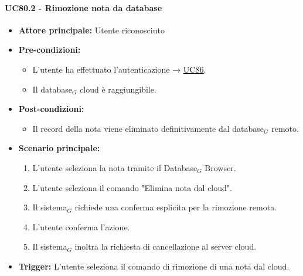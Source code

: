 \documentclass[a4paper, 10pt]{article}
\newcommand{\uclink}[2]{\hyperlink{#1}{\textcolor{black}{\underline{#2}}}}
\begin{document}
\paragraph{UC80.2 - Rimozione nota da database}
\hypertarget{uc:80.2}{}
\begin{itemize}
    \item \textbf{Attore principale:} Utente riconosciuto
    \item \textbf{Pre-condizioni:} 
        \begin{itemize}
            \item L'utente ha effettuato l'autenticazione → \uclink{uc:86}{UC86}.
            \item Il database$_G$ cloud è raggiungibile.
        \end{itemize}
    \item \textbf{Post-condizioni:} 
        \begin{itemize}
            \item Il record della nota viene eliminato definitivamente dal database$_G$ remoto.
        \end{itemize}
    \item \textbf{Scenario principale:}
        \begin{enumerate}
            \item L'utente seleziona la nota tramite il Database$_G$ Browser.
            \item L'utente seleziona il comando "Elimina nota dal cloud".
            \item Il sistema$_G$ richiede una conferma esplicita per la rimozione remota.
            \item L'utente conferma l'azione.
            \item Il sistema$_G$ inoltra la richiesta di cancellazione al server cloud.
        \end{enumerate}
    \item \textbf{Trigger:} L'utente seleziona il comando di rimozione di una nota dal cloud.
\end{itemize}

\end{document}
